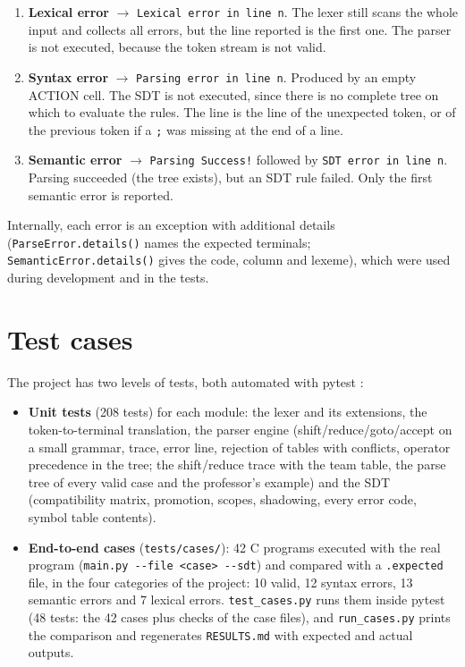 \documentclass[11pt,letterpaper]{article}
\let\oldsection\section
\renewcommand{\section}{\needspace{8\baselineskip}\oldsection}
\newcommand{\tok}[1]{\texttt{#1}}
\newcommand{\ok}[1]{\textcolor{okgreen}{\texttt{#1}}}
\newcommand{\bad}[1]{\textcolor{errred}{\texttt{#1}}}
\begin{document}
\begin{enumerate}
  \item \textbf{Lexical error} $\rightarrow$ \bad{Lexical error in line n}.
        The lexer still scans the whole input and collects all errors, but
        the line reported is the first one. The parser is not executed,
        because the token stream is not valid.
  \item \textbf{Syntax error} $\rightarrow$ \bad{Parsing error in line n}.
        Produced by an empty ACTION cell. The SDT is not executed, since
        there is no complete tree on which to evaluate the rules. The line is
        the line of the unexpected token, or of the previous token if a
        \tok{;} was missing at the end of a line.
  \item \textbf{Semantic error} $\rightarrow$ \ok{Parsing Success!} followed
        by \bad{SDT error in line n}. Parsing succeeded (the tree exists), but
        an SDT rule failed. Only the first semantic error is reported.
\end{enumerate}

Internally, each error is an exception with additional details
(\texttt{ParseError.details()} names the expected terminals;
\texttt{SemanticError.details()} gives the code, column and lexeme), which
were used during development and in the tests.

\section{Test cases}

The project has two levels of tests, both automated with pytest \cite{pytest}:

\begin{itemize}
  \item \textbf{Unit tests} (208 tests) for each module: the lexer and its
        extensions, the token-to-terminal translation, the parser engine
        (shift/reduce/goto/accept on a small grammar, trace, error line,
        rejection of tables with conflicts, operator precedence in the tree; the
        shift/reduce trace with the team table, the parse tree of every valid
        case and the professor's example)
        and the SDT (compatibility matrix, promotion, scopes, shadowing,
        every error code, symbol table contents).
  \item \textbf{End-to-end cases} (\texttt{tests/cases/}): 42 C programs
        executed with the real program (\texttt{main.py -{}-file <case> -{}-sdt})
        and compared with a \texttt{.expected} file, in the four categories
        of the project: 10 valid, 12 syntax errors, 13 semantic errors and 7
        lexical errors. \texttt{test\_cases.py} runs them inside pytest
        (48 tests: the 42 cases plus checks of the case files), and \texttt{run\_cases.py} prints the comparison and
        regenerates \texttt{RESULTS.md} with expected and actual outputs.
\end{itemize}
\end{document}
